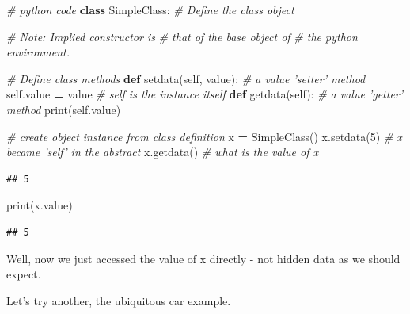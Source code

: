 \documentclass[]{book}
\newenvironment{Shaded}{\begin{snugshade}}{\end{snugshade}}
\newcommand{\KeywordTok}[1]{\textcolor[rgb]{0.13,0.29,0.53}{\textbf{#1}}}
\newcommand{\DecValTok}[1]{\textcolor[rgb]{0.00,0.00,0.81}{#1}}
\newcommand{\CommentTok}[1]{\textcolor[rgb]{0.56,0.35,0.01}{\textit{#1}}}
\newcommand{\VariableTok}[1]{\textcolor[rgb]{0.00,0.00,0.00}{#1}}
\newcommand{\OperatorTok}[1]{\textcolor[rgb]{0.81,0.36,0.00}{\textbf{#1}}}
\newcommand{\BuiltInTok}[1]{#1}
\newcommand{\NormalTok}[1]{#1}
\theoremstyle{definition}
\theoremstyle{definition}
\theoremstyle{definition}
\theoremstyle{remark}
\begin{document}
\begin{Shaded}
\begin{Highlighting}[]
\CommentTok{# python code}
\KeywordTok{class}\NormalTok{ SimpleClass:                 }
  \CommentTok{# Define the class object}
  
  \CommentTok{# Note: Implied constructor is  }
  \CommentTok{#    that of the base object of  }
  \CommentTok{#    the python environment.}
  
  \CommentTok{# Define class methods}
  \KeywordTok{def}\NormalTok{ setdata(}\VariableTok{self}\NormalTok{, value):       }\CommentTok{# a value 'setter' method}
    \VariableTok{self}\NormalTok{.value }\OperatorTok{=}\NormalTok{ value            }\CommentTok{#   self is the instance itself}
  \KeywordTok{def}\NormalTok{ getdata(}\VariableTok{self}\NormalTok{):              }\CommentTok{# a value 'getter' method}
    \BuiltInTok{print}\NormalTok{(}\VariableTok{self}\NormalTok{.value)}
    
\CommentTok{# create object instance from class definition}
\NormalTok{x }\OperatorTok{=}\NormalTok{ SimpleClass()}
\NormalTok{x.setdata(}\DecValTok{5}\NormalTok{)                      }\CommentTok{# x became 'self' in the abstract}
\NormalTok{x.getdata()                       }\CommentTok{# what is the value of x}
\end{Highlighting}
\end{Shaded}

\begin{verbatim}
## 5
\end{verbatim}

\begin{Shaded}
\begin{Highlighting}[]
\BuiltInTok{print}\NormalTok{(x.value)}
\end{Highlighting}
\end{Shaded}

\begin{verbatim}
## 5
\end{verbatim}

Well, now we just accessed the value of x directly - not hidden data as
we should expect.

Let's try another, the ubiquitous car example.
\end{document}

